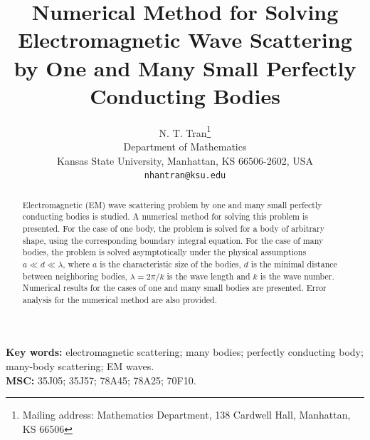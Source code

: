 \documentclass[12pt]{article}
\title{Numerical Method for Solving Electromagnetic Wave Scattering by One and Many Small Perfectly Conducting Bodies}
\author{N. T. Tran\footnote{Mailing address:  Mathematics Department, 138 Cardwell Hall, Manhattan, KS 66506} \\
\small Department of Mathematics\\[-0.8ex]
\small Kansas State University, Manhattan, KS 66506-2602, USA\\
\small \texttt{nhantran@ksu.edu}}
\date{}
\numberwithin{equation}{section}
\begin{document}
\maketitle

\begin{abstract}
Electromagnetic (EM) wave scattering problem by one and many small perfectly conducting bodies is studied. A numerical method for solving this problem is presented. For the case of one body, the problem is solved for a body of arbitrary shape, using the corresponding boundary integral equation. For the case of many bodies, the problem is solved asymptotically under the physical assumptions $a\ll d \ll \lambda$, where $a$ is the characteristic size of the bodies, $d$ is the minimal distance between neighboring bodies, $\lambda=2\pi/k$ is the wave length and $k$ is the wave number. Numerical results for the cases of one and many small bodies are presented. Error analysis for the numerical method are also provided.
\end{abstract}

\noindent\textbf{Key words:} electromagnetic scattering; many bodies; perfectly conducting body; many-body scattering; EM waves. \\

\noindent\textbf{MSC:} 35J05; 35J57; 78A45; 78A25; 70F10.
\end{document}
